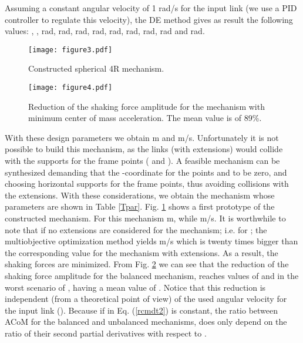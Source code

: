 \documentclass[11pt]{article}
\begin{document}
Assuming a constant angular velocity of 1 rad/s for the input link (we 
use a PID controller to regulate this velocity), the DE method gives as 
result the following values: 
, 
,
 rad,
 rad,
 rad, 
 rad,
 rad,
 rad,
 rad,
 rad and
 rad.
\begin{table}[htb]
\caption{\label{Tpar} Parameters of the constructed spherical 4R 
mechanism.}
\vspace*{0.1cm}
\centering
{}
\end{table} 
\begin{figure}[htb]
\begin{center}
\texttt{[image: figure3.pdf]} 
\caption{Constructed spherical 4R mechanism. }
\label{figure3}
\end{center}
\end{figure}
\begin{figure}[htb]
\begin{center}
\texttt{[image: figure4.pdf]} 
\caption{Reduction of the shaking force amplitude for the mechanism with 
minimum center of mass acceleration. The mean value is of 89\%. }
\label{figure4}
\end{center}
\end{figure}
With these design parameters we obtain  m and 
 m/s.  Unfortunately it is not possible to build 
this mechanism, as the links (with extensions) would collide with the 
supports for the frame points ( and ). A 
feasible mechanism can be synthesized demanding that the -coordinate 
for the points   and  to be zero, and 
choosing horizontal supports for the frame points, thus avoiding 
collisions with the extensions. With these considerations, we  obtain 
the mechanism whose parameters are shown in Table \ref{Tpar}. 
Fig. \ref{figure3} shows a first prototype of the constructed 
mechanism. For this mechanism   m, while 
 m/s. It is worthwhile to note that if no extensions 
are considered for the mechanism; i.e.  for ; the 
multiobjective optimization method yields   m/s which 
is twenty times bigger than the corresponding value for
the mechanism with extensions. As a result, the shaking forces are 
minimized. From Fig. \ref{figure4} we can see that the reduction of the 
shaking force amplitude for the balanced mechanism, reaches values 
of  and in the worst scenario of , having a mean value of 
.  Notice that this reduction is 
independent (from a theoretical point of view) of the used angular 
velocity for the input link (). Because if  
in Eq. (\ref{rcmdt2}) is constant, the ratio between ACoM for the balanced 
and unbalanced mechanisms, does only depend on the ratio of
their second partial derivatives with respect to . 
\end{document}
